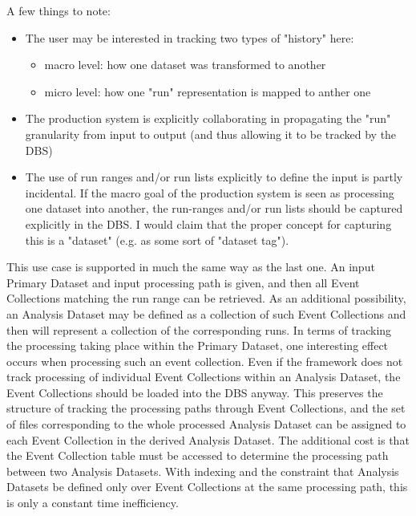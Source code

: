 \documentclass{cmspaper}
\begin{document}
  A few things to note:
\begin{itemize}

\item The user may be interested in tracking two types of "history" here:
\begin{itemize}

      \item macro level: how one dataset was transformed to another
      \item micro level: how one "run" representation is mapped to anther one
\end{itemize}

\item The production system is explicitly collaborating in propagating the
    "run" granularity from input to output (and thus allowing it to be
    tracked by the DBS)

\item The use of run ranges and/or run lists explicitly to define the input is 
    partly incidental. If the macro goal of the production system is seen as
    processing one dataset into another, the run-ranges and/or run lists 
    should be captured explicitly in the DBS. I would claim that the proper 
    concept for capturing this is a "dataset" (e.g. as some sort of "dataset 
    tag"). 

\end{itemize}

This use case is supported in much the same way as the last one.  An input 
Primary Dataset and input processing path is given, and then all Event Collections
matching the run range can be retrieved.  As an additional possibility, an 
Analysis Dataset may be defined as a collection of such Event Collections and then will 
represent a collection of the corresponding runs.  In terms of tracking the processing
taking place within the Primary Dataset, one interesting effect occurs when 
processing such an event collection.  Even if the framework does not track processing
of individual Event Collections within an Analysis Dataset, the Event Collections 
should be loaded into the DBS anyway.  This preserves the structure of tracking 
the processing paths through Event Collections, and the set of 
files corresponding to the whole processed Analysis Dataset can be assigned to 
each Event Collection in the derived Analysis Dataset.  The additional cost is that 
the Event Collection table must be accessed to determine the processing path between 
two Analysis Datasets.  With indexing and the constraint that Analysis Datasets be 
defined only over Event Collections at the same processing path, this is only a 
constant time inefficiency.
\end{document}
